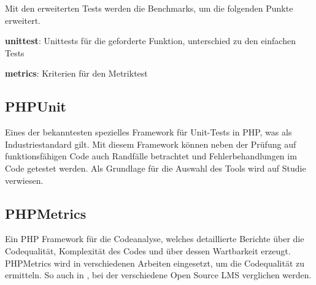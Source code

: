 Mit den erweiterten Tests werden die Benchmarks, um die folgenden Punkte erweitert.

\begin{myitemize}
	\item \textbf{unittest}: Unittests für die geforderte Funktion, unterschied zu den einfachen Tests
	\item \textbf{metrics}: Kriterien für den Metriktest
\end{myitemize}

\subsection{PHPUnit}
Eines der bekanntesten spezielles Framework für Unit-Tests in PHP, was als Industriestandard gilt. Mit diesem Framework können neben der Prüfung auf funktionsfähigen Code auch Randfälle betrachtet und Fehlerbehandlungen im Code getestet werden. Als Grundlage für die Auswahl des Tools wird auf Studie \cite{mohamad-2016} verwiesen.

\subsection{PHPMetrics}
Ein PHP Framework für die Codeanalyse, welches detaillierte Berichte über die Codequalität, Komplexität des Codes und über dessen Wartbarkeit erzeugt. PHPMetrics wird in verschiedenen Arbeiten eingesetzt, um die Codequalität zu ermitteln. So auch in \cite{anggrain-2016}, bei der verschiedene Open Source LMS verglichen werden.


